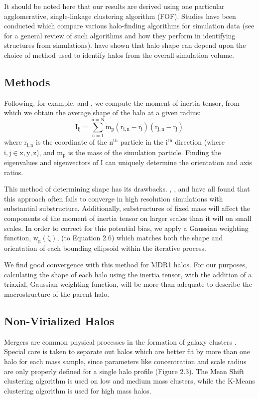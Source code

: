 It should be noted here that our results are derived using one
particular agglomerative, single-linkage clustering algorithm
(FOF). Studies have been conducted which compare various halo-finding
algorithms for simulation data (see \citet{KnebeEtAl2011} for a
general review of such algorithms and how they perform in identifying
structures from simulations). \citet{DespaliEtAl2013} have shown that
halo shape can depend upon the choice of method used to identify halos
from the overall simulation volume.

\subsection{Methods}
Following, for example, \citet{WarrenEtAl1992} and \citet{ShawEtAl2006}, we
compute the moment of inertia tensor, from which we obtain the average
shape of the halo at a given radius:
\begin{equation}
\mathrm{I_{ij} = \sum_{n=1}^{n=N} m_{p} (r_{i,n} - \bar{r_{i}})(r_{j,n} - \bar{r_{j}})}
\end{equation}
where $\mathrm{r_{i,n}}$ is the coordinate of the $\mathrm{n^{th}}$ particle in the
$\mathrm{i^{th}}$ direction (where $\mathrm{i,j \in {x,y,z}}$), and
$\mathrm{m_{p}}$ is the mass of the simulation particle. Finding the eigenvalues
and eigenvectors of $\mathrm{I}$ can uniquely determine the orientation and
axis ratios. 

This method of determining shape has its
drawbacks. \citet{ShawEtAl2006}, \citet{JingSuto2002}, and
\citet{BailinSteinmetz2004} have all found that this approach often
fails to converge in high resolution simulations with substantial
substructure. Additionally, substructures of fixed mass will affect
the components of the moment of inertia tensor on larger 
scales than it will on small scales. In order to correct for this
potential bias, we apply a Gaussian weighting function, $\mathrm{w_{g}
(\zeta)}$, (to Equation 2.6) which matches both the shape and orientation
of each bounding ellipsoid within the iterative process. 

 We find good convergence with this method for MDR1 halos. For our
 purposes, calculating the shape of each halo using the inertia
 tensor, with the addition of a triaxial, Gaussian weighting function,
 will be more than adequate to describe the macrostructure of the
 parent halo.   

\subsection{Non-Virialized Halos}
Mergers are common physical processes in the
formation of galaxy clusters
\citep{PS1974,BondEtAl1991,LaceyCole1993}. Special care is taken to 
separate out halos which are better fit by more than one halo for each
mass sample, since parameters like concentration and scale radius are
only properly defined for a single halo profile (Figure 2.3). The Mean Shift
clustering algorithm \citep{FukunagaHostetler1975} is used on low and
medium mass clusters, while the K-Means \citep{HartiganWong1979}
clustering algorithm is used for high mass halos.  

